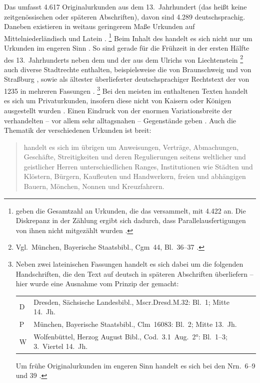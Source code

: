 Das \CAO{} umfasst 4.617 Originalurkunden aus dem 13.\ Jahrhundert
(das heißt keine zeitgenössischen oder späteren Abschriften), davon sind 4.289
deutschsprachig. Daneben existieren in weitaus geringerem Maße Urkunden auf
Mittelniederländisch und Latein
\autocites[\RN{1}]{deboor1976}[25]{schulze2011}[40--41]{ganslmayer2012}.%
%
	\footnote{\citet[391]{gniffkerapp2005} geben die Gesamtzahl an Urkunden,
	die das \CAO{} versammelt, mit 4.422 an. Die Diskrepanz in der
	Zählung ergibt sich dadurch, dass Parallelausfertigungen von ihnen nicht
	mitgezählt wurden
	\autocite[vgl.][40]{ganslmayer2012}.\label{fn:caowordcount}}
%
Beim Inhalt des \CAO{} handelt es sich nicht nur um Urkunden im
engeren Sinn \autocite[596]{schmidtwiegand1998b}. So sind gerade für die
Frühzeit in der ersten Hälfte des 13.~Jahrhunderts neben dem  \autocite[1]{cao1} und der  aus dem
 Ulrichs von Liechtenstein \autocite[3]{cao1}%
%
	\footnote{Vgl.\ München, Bayerische Staatsbibl., Cgm~44, Bl.~36\va--37\rb{}
	\autocite[1307]{hsc}.}
%
auch diverse Stadtrechte enthalten, beispielsweise die von Braunschweig und von
Straßburg \autocites[2]{cao1}[N~238~AB]{cao5}, sowie als ältester
überlieferter deutschsprachiger Rechtstext der 
von 1235 in mehreren Fassungen \autocite[4]{cao1}.%
%
	\footnote{Neben zwei lateinischen Fassungen \autocite[\ppno~4~Dor,
	4~F]{cao1} handelt es sich dabei um die folgenden Handschriften, die den
	Text auf deutsch in späteren Abschriften überliefern -- hier wurde eine
	Ausnahme vom Prinzip der  gemacht:

	\begin{tabularx}{\linewidth}{@{} l >{\citereset}X @{}}
	D & Dresden, Sächsische Landesbibl., Mscr.Dresd.M.32: Bl.~1\ro\vo; Mitte 14.\ Jh.
		\autocite[7549]{hsc}
	\\

	P & München, Bayerische Staatsbibl., Clm~16083: Bl.~2\ro; Mitte
		13.\ Jh. \autocites[256]{haas2010}[19293]{hsc}
	\\
	W & Wolfenbüttel, Herzog August Bibl., Cod.~3.1~Aug.~2°: Bl.~1\ro--3\vb;
		3.~Viertel 14.~Jh. \autocite[8396]{hsc}
	\\
	\end{tabularx}

	Um frühe Originalurkunden im engeren Sinn handelt es sich bei den
	Nrn.~6--9 und 39 \autocites{cao1}[vgl.][15--16]{bertelsmeierkierst2008}.%
	}
%
Bei den meisten im \CAO{} enthaltenen Texten handelt es sich um
Privaturkunden, insofern diese nicht von Kaisern oder Königen
ausgestellt wurden
\autocites[vgl.][575]{frenz1998a}[585]{frenz1998b}. Einen Eindruck von der
enormen Variationsbreite der verhandelten -- vor allem sehr alltagsnahen --
Gegen\-stände geben \textcites[11]{schulze2011}[35--36]{ganslmayer2012}.
Auch die Thematik der verschiedenen Urkunden ist
breit: \blockcquote[596]{schmidtwiegand1998b}{ handelt es sich im
übrigen um Anweisungen, Verträge, Abmachungen, Geschäfte, Streitigkeiten und
deren Regulierungen seitens weltlicher und geistlicher Herren unterschiedlichen
Ranges, Institutionen wie Städten und Klöstern, Bürgern, Kaufleuten und
Handwerkern, freien und abhängigen Bauern, Mönchen, Nonnen und Kreuzfahrern.}

